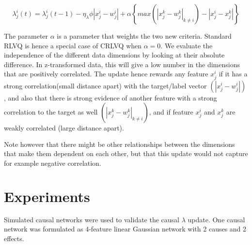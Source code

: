 \documentclass{esannV2}
\begin{document}
\begin{equation} 
\lambda_j^i(t) = \lambda_j^i(t-1) - \eta_\lambda \phi |x_j^i - w_j^i| + \alpha\left\{max(|x_j^k - w_j^k|_{k \neq i}) - |x_j^i - x_j^k|\right\} 
\end{equation}

The parameter $\alpha$ is a parameter that weights the two new criteria. Standard RLVQ is hence a special case of CRLVQ when $\alpha = 0$. We evaluate the independence of the different data dimensions by looking at their absolute difference. In z-transformed data, this will give a low number in the dimensions that are positively correlated. The update hence rewards any feature $x_j^i$ if it has a strong correlation(small distance apart) with the target/label vector $(|x_j^i - w_j^i|)$ , and also that there is strong evidence of another feature with a strong correlation to the target as well $(|x_j^k - w_j^k|_{k \neq i})$, and if feature $x_j^i$ and $x_j^k$ are weakly correlated (large distance apart).

Note however that there might be other relationships between the dimensions that make them dependent on each other, but that this update would not capture for example negative correlation. 

\section{Experiments}
\label{sec:Experiments}

Simulated causal networks were used to validate the causal $\lambda$ update. One causal network was formulated as 4-feature linear Gaussian network with 2 causes and 2 effects. 
\end{document}

